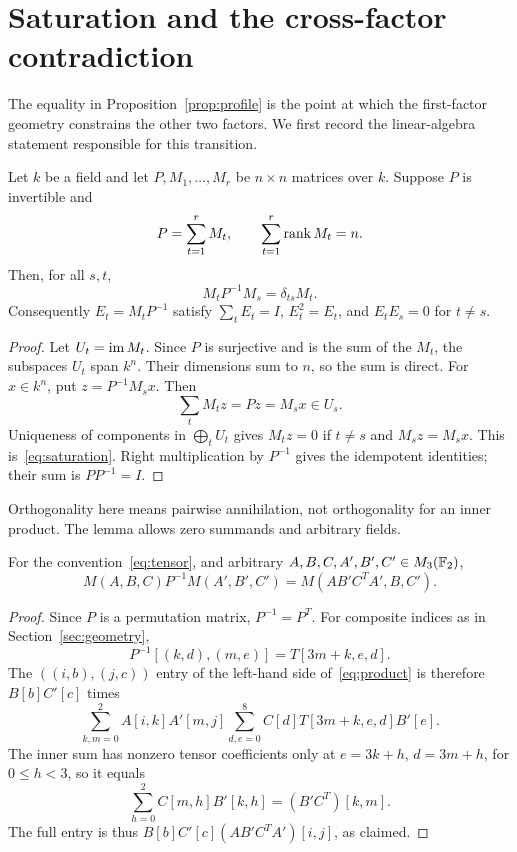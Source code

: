 \section{Saturation and the cross-factor contradiction}\label{sec:saturation}

The equality in Proposition~\ref{prop:profile} is the point at which
the first-factor geometry constrains the other two factors. We first
record the linear-algebra statement responsible for this transition.

\begin{lemma}\label{lem:saturation}
Let $k$ be a field and let $P,M_1,\ldots,M_r$ be $n\times n$
matrices over $k$. Suppose $P$ is invertible and
\[
 P=\sum_{t=1}^r M_t,\qquad \sum_{t=1}^r\operatorname{rank} M_t=n.
\]
Then, for all $s,t$,
\begin{equation}\label{eq:saturation}
 M_tP^{-1}M_s=\delta_{ts}M_t.
\end{equation}
Consequently $E_t=M_tP^{-1}$ satisfy
$\sum_tE_t=I$, $E_t^2=E_t$, and $E_tE_s=0$ for $t\ne s$.
\end{lemma}
\begin{proof}
Let $U_t=\operatorname{im} M_t$. Since $P$ is surjective and is the sum of the
$M_t$, the subspaces $U_t$ span $k^n$. Their dimensions sum to $n$,
so the sum is direct. For $x\in k^n$, put $z=P^{-1}M_sx$. Then
\[
 \sum_t M_tz=Pz=M_sx\in U_s.
\]
Uniqueness of components in $\bigoplus_tU_t$ gives $M_tz=0$ if
$t\ne s$ and $M_sz=M_sx$. This is~\eqref{eq:saturation}.
Right multiplication by $P^{-1}$ gives the idempotent identities;
their sum is $PP^{-1}=I$.
\end{proof}

Orthogonality here means pairwise annihilation, not orthogonality for
an inner product. The lemma allows zero summands and arbitrary fields.

\begin{lemma}\label{lem:product}
For the convention~\eqref{eq:tensor}, and arbitrary $A,B,C,A',B',C'
\in M_3(\mathbb F_2)$,
\begin{equation}\label{eq:product}
 M(A,B,C)P^{-1}M(A',B',C')
   =M(AB'C^TA',B,C').
\end{equation}
\end{lemma}
\begin{proof}
Since $P$ is a permutation matrix, $P^{-1}=P^T$. For composite
indices as in Section~\ref{sec:geometry},
\[
 P^{-1}[(k,d),(m,e)]=T[3m+k,e,d].
\]
The $((i,b),(j,c))$ entry of the left-hand side
of~\eqref{eq:product} is therefore $B[b]C'[c]$ times
\[
 \sum_{k,m=0}^2 A[i,k]A'[m,j]
       \sum_{d,e=0}^{8} C[d]T[3m+k,e,d]B'[e].
\]
The inner sum has nonzero tensor coefficients only at
$e=3k+h$, $d=3m+h$, for $0\leq h<3$, so it equals
\[
 \sum_{h=0}^2 C[m,h]B'[k,h]=(B'C^T)[k,m].
\]
The full entry is thus
$B[b]C'[c](AB'C^TA')[i,j]$, as claimed.
\end{proof}

